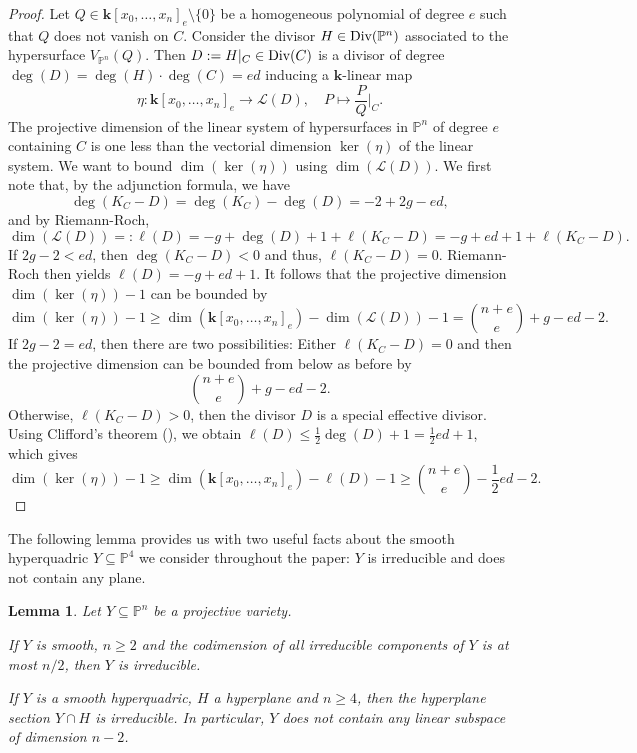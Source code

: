 \documentclass[english,11pt,reqno]{amsart}
\newcommand{\sub}{\subseteq}
\newcommand{\Pfour}{\mathbb{P}^4}
\newcommand{\Pn}{\mathbb{P}^n}
\newcommand{\VPn}{V_{\Pn}}
\newcommand{\kk}{\mathbf{k}}
\newcommand{\kPn}{\kk[x_0,\dots,x_n]}
\newcommand{\Div}{\textup{Div}}
\newtheorem{lem}[thm]{Lemma}
\begin{document}
\begin{proof}
	Let $Q\in \kPn_e\setminus\{0\}$ be a homogeneous polynomial of degree $e$ such that $Q$ does not vanish on $C$. Consider the divisor $H\in \Div(\Pn)$ associated to the hypersurface $\VPn(Q)$. Then $D:=H|_C\in \Div(C)$ is a divisor of degree $\deg(D)=\deg(H)\cdot \deg(C)=ed$ inducing a $\kk$-linear map
	$$ \eta: \kPn_e \rightarrow \mathcal{L}(D),\quad P \mapsto \frac{P}{Q}\Big|_C.$$
	The projective dimension of the linear system of hypersurfaces in $\Pn$ of degree $e$ containing $C$ is one less than the vectorial dimension $\ker(\eta)$ of the linear system. We want to bound $\dim(\ker(\eta))$ using $\dim( \mathcal{L}(D))$. We first note that, by the adjunction formula, we have  
	$$\deg(K_C - D)=\deg(K_C) - \deg(D) = -2 +2g-ed,$$
	and by Riemann-Roch,
	$$ \dim(\mathcal{L}(D))=: \ell(D) =-g+\deg(D)+1+\ell(K_C-D)=-g+ed+1+\ell(K_C-D).$$
	If $2g-2<ed$, then $\deg(K_C - D)<0$ and thus, $\ell(K_C-D)=0$. Riemann-Roch then yields
	$\ell(D) =-g+ed+1.$ It follows that the projective dimension $\dim(\ker(\eta)) -1$ can be bounded by
	$$\dim(\ker(\eta)) -1 \geq \dim(\kPn_e) - \dim(\mathcal{L}(D)) -1 = \binom{n + e}{e} + g -ed -2.$$
	If $2g-2= ed$, then there are two possibilities: Either $\ell(K_C-D)=0$ and then the projective dimension can be bounded from below as before by
	$$ \binom{n + e}{e} + g -ed -2.$$ 
	Otherwise, $\ell(K_C-D)>0$, then the divisor $D$ is a special effective divisor. Using Clifford's theorem (\cite[Thm.\ IV.5.4]{Hartshorne}), we obtain $ \ell(D)\leq \frac{1}{2}\deg(D)+1 = \frac{1}{2} ed+1 $, which gives
	$$\dim(\ker(\eta)) -1 \geq \dim(\kPn_e) - \ell(D) -1 \geq \binom{n + e}{e} -\frac{1}{2}ed-2.$$
	
\end{proof}
%
%
%
The following lemma provides us with two useful facts about the smooth hyperquadric $Y\sub \Pfour$ we consider throughout the paper: $Y$ is irreducible and does not contain any plane. 
%
\begin{lem} \label{lem:smooth_quadric_irreducible_contains_no_plane}
	Let $Y \sub \Pn$ be a projective variety.
	\begin{enumlem}
		\item If $Y$ is smooth, $n\geq 2$ and the codimension of all irreducible components of $Y$ is at most $n/2$, then $Y$ is irreducible. \label{lem:smooth_implies_irred}
		\item If $Y$ is a smooth hyperquadric, $H$ a hyperplane and $n \geq 4$, then the hyperplane section $Y \cap H$ is irreducible. In particular, $Y$ does not contain any linear subspace of dimension $n-2$. \label{lem:hyperplane_section_irred}
	\end{enumlem}
\end{lem}
\end{document}
